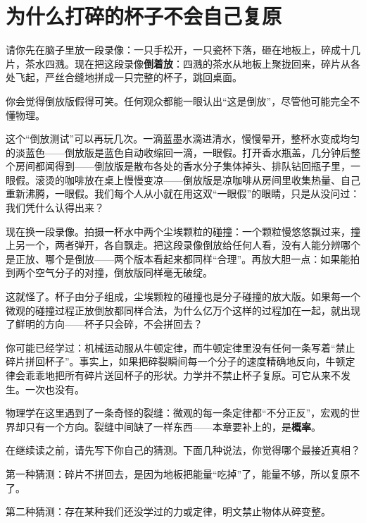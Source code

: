 \chapter{为什么打碎的杯子不会自己复原}


请你先在脑子里放一段录像：一只手松开，一只瓷杯下落，砸在地板上，碎成十几片，茶水四溅。现在把这段录像\textbf{倒着放}：四溅的茶水从地板上聚拢回来，碎片从各处飞起，严丝合缝地拼成一只完整的杯子，跳回桌面。

你会觉得倒放版假得可笑。任何观众都能一眼认出“这是倒放”，尽管他可能完全不懂物理。

这个“倒放测试”可以再玩几次。一滴蓝墨水滴进清水，慢慢晕开，整杯水变成均匀的淡蓝色——倒放版是蓝色自动收缩回一滴，一眼假。打开香水瓶盖，几分钟后整个房间都闻得到——倒放版是散布各处的香水分子集体掉头、排队钻回瓶子里，一眼假。滚烫的咖啡放在桌上慢慢变凉——倒放版是凉咖啡从房间里收集热量、自己重新沸腾，一眼假。我们每个人从小就在用这双“一眼假”的眼睛，只是从没问过：我们凭什么认得出来？

现在换一段录像。拍摄一杯水中两个尘埃颗粒的碰撞：一个颗粒慢悠悠飘过来，撞上另一个，两者弹开，各自飘走。把这段录像倒放给任何人看，没有人能分辨哪个是正放、哪个是倒放——两个版本看起来都同样“合理”。再放大胆一点：如果能拍到两个空气分子的对撞，倒放版同样毫无破绽。

这就怪了。杯子由分子组成，尘埃颗粒的碰撞也是分子碰撞的放大版。如果每一个微观的碰撞过程正放倒放都同样合法，为什么亿万个这样的过程加在一起，就出现了鲜明的方向——杯子只会碎，不会拼回去？

你可能已经学过：机械运动服从牛顿定律，而牛顿定律里没有任何一条写着“禁止碎片拼回杯子”。事实上，如果把碎裂瞬间每一个分子的速度精确地反向，牛顿定律会乖乖地把所有碎片送回杯子的形状。力学并不禁止杯子复原。可它从来不发生。一次也没有。

\begin{mainline}
物理学在这里遇到了一条奇怪的裂缝：微观的每一条定律都“不分正反”，宏观的世界却只有一个方向。裂缝中间缺了一样东西——本章要补上的，是\textbf{概率}。
\end{mainline}


在继续读之前，请先写下你自己的猜测。下面几种说法，你觉得哪个最接近真相？

第一种猜测：碎片不拼回去，是因为地板把能量“吃掉”了，能量不够，所以复原不了。

第二种猜测：存在某种我们还没学过的力或定律，明文禁止物体从碎变整。

